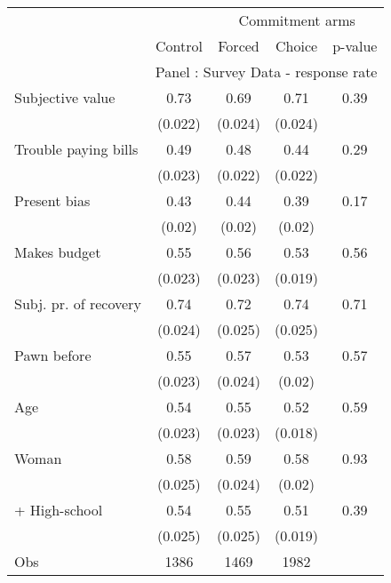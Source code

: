 \begin{tabular}{lcccc}
\toprule
      &       & \multicolumn{3}{c}{Commitment arms} \\
\cmidrule{3-5}      & \multicolumn{1}{p{4.5em}}{Control} & \multicolumn{1}{p{4.93em}}{Forced} & \multicolumn{1}{p{3.43em}}{Choice} & \multicolumn{1}{p{3.43em}}{p-value} \\
\midrule
      & \multicolumn{4}{c}{Panel  : Survey Data - response rate} \\
\midrule
\midrule
Subjective value & 0.73  & 0.69  & 0.71  & 0.39 \\
      & (0.022) & (0.024) & (0.024) &  \\
Trouble paying bills & 0.49  & 0.48  & 0.44  & 0.29 \\
      & (0.023) & (0.022) & (0.022) &  \\
Present bias & 0.43  & 0.44  & 0.39  & 0.17 \\
      & (0.02) & (0.02) & (0.02) &  \\
Makes budget & 0.55  & 0.56  & 0.53  & 0.56 \\
      & (0.023) & (0.023) & (0.019) &  \\
Subj. pr. of recovery & 0.74  & 0.72  & 0.74  & 0.71 \\
      & (0.024) & (0.025) & (0.025) &  \\
Pawn before & 0.55  & 0.57  & 0.53  & 0.57 \\
      & (0.023) & (0.024) & (0.02) &  \\
Age   & 0.54  & 0.55  & 0.52  & 0.59 \\
      & (0.023) & (0.023) & (0.018) &  \\
Woman & 0.58  & 0.59  & 0.58  & 0.93 \\
      & (0.025) & (0.024) & (0.02) &  \\
+ High-school & 0.54  & 0.55  & 0.51  & 0.39 \\
      & (0.025) & (0.025) & (0.019) &  \\
\midrule
Obs   & 1386  & 1469  & 1982  &  \\
\bottomrule
\bottomrule
\end{tabular}%
